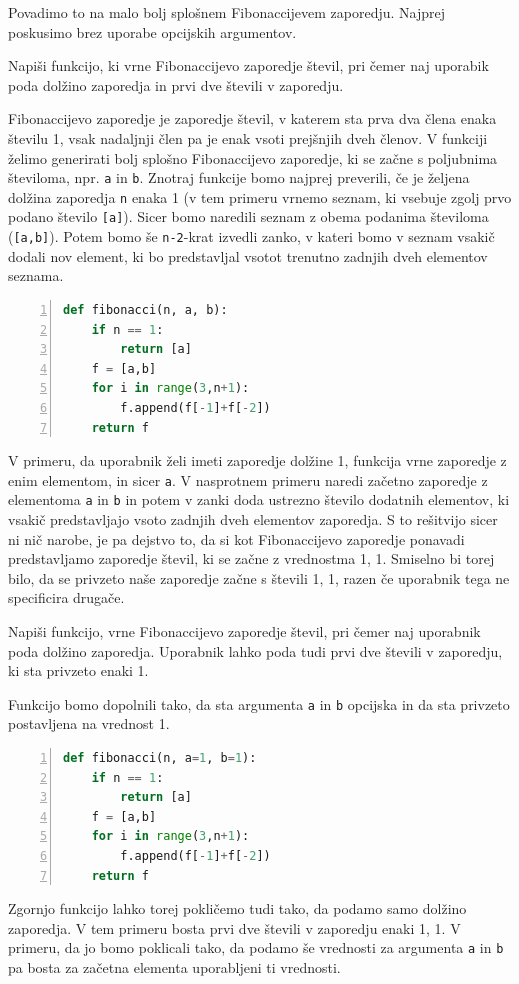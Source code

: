Povadimo to na malo bolj splošnem Fibonaccijevem zaporedju. Najprej poskusimo brez uporabe opcijskih argumentov.
\begin{zgled}
Napiši funkcijo, ki vrne Fibonaccijevo zaporedje števil, pri čemer naj uporabik poda dolžino zaporedja in prvi dve števili v zaporedju.
\end{zgled}
\begin{resitev}
Fibonaccijevo zaporedje je zaporedje števil, v katerem sta prva dva člena enaka številu 1, vsak nadaljnji člen pa je enak vsoti prejšnjih dveh členov. V funkciji želimo generirati bolj splošno Fibonaccijevo zaporedje, ki se začne s poljubnima številoma, npr. \texttt{a} in \texttt{b}. Znotraj funkcije bomo najprej preverili, če je željena dolžina zaporedja \texttt{n} enaka 1 (v tem primeru vrnemo seznam, ki vsebuje zgolj prvo podano število \texttt{[a]}). Sicer bomo naredili seznam z obema podanima številoma (\texttt{[a,b]}). Potem bomo še \texttt{n-2}-krat izvedli zanko, v kateri bomo v seznam vsakič dodali nov element, ki bo predstavljal vsotot trenutno zadnjih dveh elementov seznama. 
\begin{lstlisting}[language=Python,numbers=left]
def fibonacci(n, a, b):
    if n == 1:
        return [a]
    f = [a,b]
    for i in range(3,n+1):
        f.append(f[-1]+f[-2])
    return f
\end{lstlisting}
\end{resitev}
V primeru, da uporabnik želi imeti zaporedje dolžine 1, funkcija vrne zaporedje z enim elementom, in sicer \texttt{a}. V nasprotnem primeru naredi začetno zaporedje z elementoma \texttt{a} in \texttt{b} in potem v zanki doda ustrezno število dodatnih elementov, ki vsakič predstavljajo vsoto zadnjih dveh elementov zaporedja. S to rešitvijo sicer ni nič narobe, je pa dejstvo to, da si kot Fibonaccijevo zaporedje ponavadi predstavljamo zaporedje števil, ki se začne z vrednostma 1, 1. Smiselno bi torej bilo, da se privzeto naše zaporedje začne s števili 1, 1, razen če uporabnik tega ne specificira drugače. 
\begin{zgled}
Napiši funkcijo, vrne Fibonaccijevo zaporedje števil, pri čemer naj uporabnik poda dolžino zaporedja. Uporabnik lahko poda tudi prvi dve števili v zaporedju, ki sta privzeto enaki 1.
\end{zgled}
\begin{resitev} Funkcijo bomo dopolnili tako, da sta argumenta \texttt{a} in \texttt{b} opcijska in da sta privzeto postavljena na vrednost 1. 
\begin{lstlisting}[language=Python,numbers=left]
def fibonacci(n, a=1, b=1):
    if n == 1:
        return [a]
    f = [a,b]
    for i in range(3,n+1):
        f.append(f[-1]+f[-2])
    return f
\end{lstlisting}
\end{resitev}
Zgornjo funkcijo lahko torej pokličemo tudi tako, da podamo samo dolžino zaporedja. V tem primeru bosta prvi dve števili v zaporedju enaki 1, 1. V primeru, da jo bomo poklicali tako, da podamo še vrednosti za argumenta \texttt{a} in \texttt{b} pa bosta za začetna elementa uporabljeni ti vrednosti.